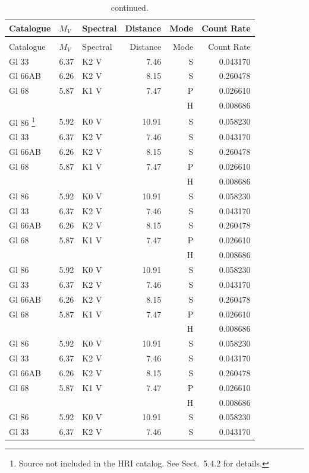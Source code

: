 \documentclass{aa}
\begin{document}
\begin{appendix}
\begin{landscape}
\begin{longtable}{lllrrr}
Catalogue& $M_{V}$ & Spectral & Distance & Mode & Count Rate \\
\hline
\endfirsthead
\caption{continued.}\\
\hline\hline
Catalogue& $M_{V}$ & Spectral & Distance & Mode & Count Rate \\
\hline
\endhead
\hline
\endfoot
Gl 33    & 6.37 & K2 V & 7.46 & S & 0.043170\\
Gl 66AB  & 6.26 & K2 V & 8.15 & S & 0.260478\\
Gl 68    & 5.87 & K1 V & 7.47 & P & 0.026610\\
         &      &      &      & H & 0.008686\\
Gl 86
\footnote{Source not included in the HRI catalog. See Sect.~5.4.2 for details.}
         & 5.92 & K0 V & 10.91& S & 0.058230\\
         Gl 33    & 6.37 & K2 V & 7.46 & S & 0.043170\\
Gl 66AB  & 6.26 & K2 V & 8.15 & S & 0.260478\\
Gl 68    & 5.87 & K1 V & 7.47 & P & 0.026610\\
         &      &      &      & H & 0.008686\\
Gl 86    & 5.92 & K0 V & 10.91& S & 0.058230\\
Gl 33    & 6.37 & K2 V & 7.46 & S & 0.043170\\
Gl 66AB  & 6.26 & K2 V & 8.15 & S & 0.260478\\
Gl 68    & 5.87 & K1 V & 7.47 & P & 0.026610\\
         &      &      &      & H & 0.008686\\
Gl 86    & 5.92 & K0 V & 10.91& S & 0.058230\\   Gl 33    & 6.37 & K2 V & 7.46 & S & 0.043170\\
Gl 66AB  & 6.26 & K2 V & 8.15 & S & 0.260478\\
Gl 68    & 5.87 & K1 V & 7.47 & P & 0.026610\\
         &      &      &      & H & 0.008686\\
Gl 86    & 5.92 & K0 V & 10.91& S & 0.058230\\   Gl 33    & 6.37 & K2 V & 7.46 & S & 0.043170\\
Gl 66AB  & 6.26 & K2 V & 8.15 & S & 0.260478\\
Gl 68    & 5.87 & K1 V & 7.47 & P & 0.026610\\
         &      &      &      & H & 0.008686\\
Gl 86    & 5.92 & K0 V & 10.91& S & 0.058230\\   Gl 33    & 6.37 & K2 V & 7.46 & S & 0.043170\\

\end{longtable}
\end{landscape}
\end{appendix}
\end{document}
